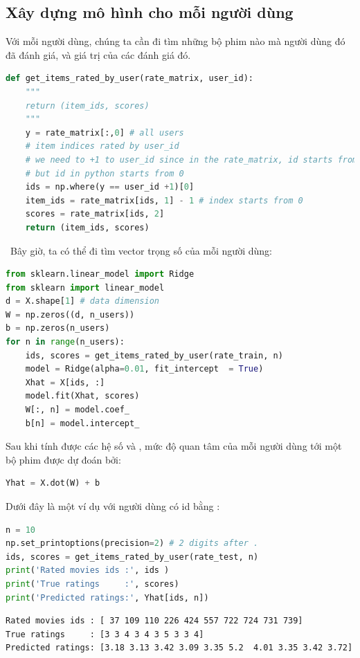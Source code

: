 \subsection{Xây dựng mô hình cho mỗi người dùng}
Với mỗi người dùng, chúng ta cần đi tìm những bộ phim nào mà
người dùng đó đã đánh giá, và giá trị của các đánh giá đó. 
\begin{lstlisting}[language=Python]
def get_items_rated_by_user(rate_matrix, user_id):
    """
    return (item_ids, scores)
    """
    y = rate_matrix[:,0] # all users
    # item indices rated by user_id
    # we need to +1 to user_id since in the rate_matrix, id starts from 1 
    # but id in python starts from 0
    ids = np.where(y == user_id +1)[0] 
    item_ids = rate_matrix[ids, 1] - 1 # index starts from 0 
    scores = rate_matrix[ids, 2]
    return (item_ids, scores)
\end{lstlisting}
\
Bây giờ, ta có thể đi tìm vector trọng số của mỗi người dùng: 
 
\begin{lstlisting}[language=Python]
from sklearn.linear_model import Ridge
from sklearn import linear_model
d = X.shape[1] # data dimension
W = np.zeros((d, n_users))
b = np.zeros(n_users)
for n in range(n_users):    
    ids, scores = get_items_rated_by_user(rate_train, n)
    model = Ridge(alpha=0.01, fit_intercept  = True)
    Xhat = X[ids, :]
    model.fit(Xhat, scores) 
    W[:, n] = model.coef_
    b[n] = model.intercept_
\end{lstlisting}
 
Sau khi tính được các hệ số  và ,
mức độ quan tâm của mỗi người dùng tới một bộ phim được dự đoán
bởi:
\begin{lstlisting}[language=Python]
Yhat = X.dot(W) + b 
\end{lstlisting}
 
Dưới đây là một ví dụ với người dùng có {id} bằng :
 
\begin{lstlisting}[language=Python]
n = 10
np.set_printoptions(precision=2) # 2 digits after . 
ids, scores = get_items_rated_by_user(rate_test, n)
print('Rated movies ids :', ids )
print('True ratings     :', scores)
print('Predicted ratings:', Yhat[ids, n])
\end{lstlisting}
\kq 
\begin{lstlisting}
Rated movies ids : [ 37 109 110 226 424 557 722 724 731 739]
True ratings     : [3 3 4 3 4 3 5 3 3 4]
Predicted ratings: [3.18 3.13 3.42 3.09 3.35 5.2  4.01 3.35 3.42 3.72]
\end{lstlisting}
 
